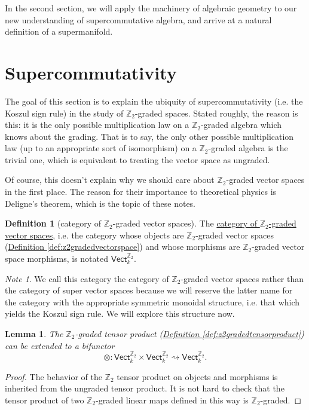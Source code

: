\documentclass[a4paper]{report}
\newcommand{\Z}{\mathbb{Z}}
\newcommand{\defn}[1]{\ul{#1}}
\theoremstyle{definition}
\newtheorem{definition}{Definition}[section]
\theoremstyle{plain}
\newtheorem{lemma}{Lemma}[section]
\theoremstyle{remark}
\newtheorem{note}{Note}[section]
\begin{document}
In the second section, we will apply the machinery of algebraic geometry to our new understanding of supercommutative algebra, and arrive at a natural definition of a supermanifold.

\section{Supercommutativity}
The goal of this section is to explain the ubiquity of supercommutativity (i.e. the Koszul sign rule) in the study of $\Z_{2}$-graded spaces. Stated roughly, the reason is this: it is the only possible multiplication law on a $\Z_{2}$-graded algebra which knows about the grading. That is to say, the only other possible multiplication law (up to an appropriate sort of isomorphism) on a $\Z_{2}$-graded algebra is the trivial one, which is equivalent to treating the vector space as ungraded. 

Of course, this doesn't explain why we should care about $\Z_{2}$-graded vector spaces in the first place. The reason for their importance to theoretical physics is Deligne's theorem, which is the topic of these notes.

\begin{definition}[category of $\Z_{2}$-graded vector spaces]
  \label{def:categoryofz2gradedvectorspaces}
  The \defn{category of $\Z_{2}$-graded vector spaces}, i.e. the category whose objects are $\Z_{2}$-graded vector spaces (\hyperref[def:z2gradedvectorspace]{Definition \ref*{def:z2gradedvectorspace}}) and whose morphisms are $\Z_{2}$-graded vector space morphisms, is notated $\mathsf{Vect}_{k}^{\Z_{2}}$.
\end{definition}

\begin{note}
  We call this category the category of $\Z_{2}$-graded vector spaces rather than the category of super vector spaces because we will reserve the latter name for the category with the appropriate symmetric monoidal structure, i.e. that which yields the Koszul sign rule. We will explore this structure now.
\end{note}

\begin{lemma}
  The $\Z_{2}$-graded tensor product (\hyperref[def:z2gradedtensorproduct]{Definition \ref*{def:z2gradedtensorproduct}}) can be extended to a bifunctor 
  \begin{equation*}
    \otimes\colon \mathsf{Vect}_k^{\Z_{2}} \times \mathsf{Vect}_k^{\Z_{2}} \rightsquigarrow \mathsf{Vect}_k^{\Z_{2}}.
  \end{equation*}
\end{lemma}
\begin{proof}
  The behavior of the $\Z_{2}$ tensor product on objects and morphisms is inherited from the ungraded tensor product. It is not hard to check that the tensor product of two $\Z_{2}$-graded linear maps defined in this way is $\Z_{2}$-graded.
\end{proof}
\end{document}
